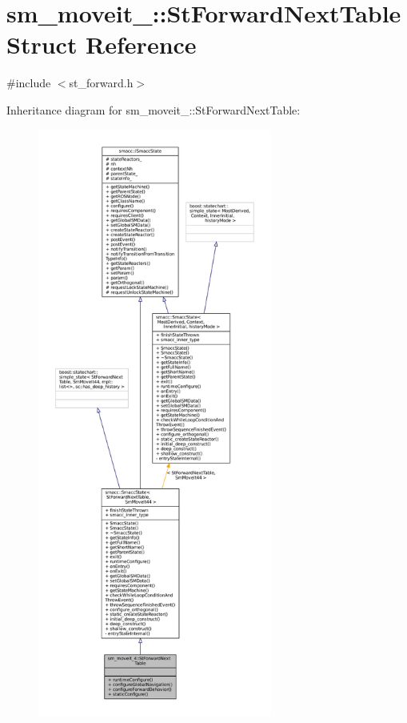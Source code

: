 \hypertarget{structsm__moveit__4_1_1StForwardNextTable}{}\section{sm\+\_\+moveit\+\_\+:\+:St\+Forward\+Next\+Table Struct Reference}
\label{structsm__moveit__4_1_1StForwardNextTable}


{\ttfamily \#include $<$st\+\_\+forward.\+h$>$}



Inheritance diagram for sm\+\_\+moveit\+\_\+:\+:St\+Forward\+Next\+Table\+:
\nopagebreak
\begin{figure}[H]
\begin{center}
\leavevmode
\includegraphics[height=550pt]{structsm__moveit__4_1_1StForwardNextTable__inherit__graph}
\end{center}
\end{figure}


